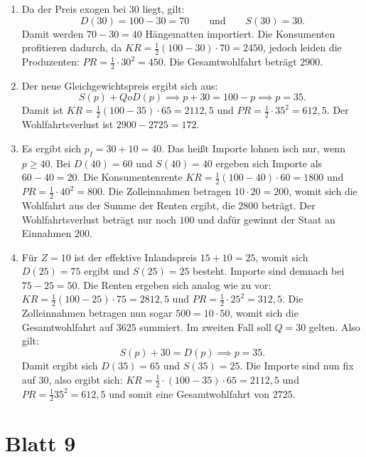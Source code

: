 \begin{solution}
	\begin{enumerate}
		\item Da der Preis exogen bei $30$ liegt, gilt:
		      \[
			      D(30) = 100-30 = 70 \qquad \text{und} \qquad S(30) = 30
			      .\]
		      Damit werden $70-30 = 40$ Hängematten importiert.
		      Die Konsumenten profitieren dadurch, da $KR = \frac{1}{2} (100-30) \cdot 70 = 2450$, jedoch leiden die Produzenten: $PR= \frac{1}{2} \cdot 30^2 = 450$.
		      Die Gesamtwohlfahrt beträgt $2900$.
		\item Der neue Gleichgewichtspreis ergibt sich aus:
		      \[
			      S(p) + Q o D(p) \implies p+30 = 100-p \implies p = 35
			      .\]
		      Damit ist $KR= \frac{1}{2} (100-35) \cdot 65 = 2112,5$ und $PR= \frac{1}{2} \cdot 35^2 = 612,5$.
		      Der Wohlfahrtsverlust ist $2900-2725 = 172$.
		\item Es ergibt sich $p_{I} = 30+10 = 40$. Das heißt Importe lohnen isch nur, wenn $p\ge 40$. Bei $D(40) = 60$ und $S(40)=40$ ergeben sich Importe als $60-40=20$.
		      Die Konsumentenrente $KR= \frac{1}{2} (100-40) \cdot 60= 1800$ und $PR=\frac{1}{2} \cdot 40^2 = 800$.
		      Die Zolleinnahmen betragen $10\cdot 20=200$, womit sich die Wohlfahrt aus der Summe der Renten ergibt, die $2800$ beträgt.
		      Der Wohlfahrtsverlust beträgt nur noch $100$ und dafür gewinnt der Staat an Einnahmen $200$.
		\item Für $Z=10$  ist der effektive Inlandspreis $15+10 = 25$, womit sich $D(25) = 75$ ergibt und $S(25)=25$ besteht. Importe sind demnach bei $75-25=50$.
		      Die Renten ergeben sich analog wie zu vor: $KR= \frac{1}{2} (100-25) \cdot 75 = 2812,5$ und $PR= \frac{1}{2} \cdot 25^2 = 312,5$.
		      Die Zolleinnahmen betragen nun sogar $500 = 10 \cdot 50$, womit sich die Gesamtwohlfahrt auf $3625$ summiert.
		      Im zweiten Fall soll $Q=30$ gelten. Also gilt:
		      \[
			      S(p) + 30 = D(p) \implies p = 35
			      .\]
		      Damit ergibt sich $D(35)=65$ und $S(35) = 25$. Die Importe sind nun fix auf $30$, also ergibt sich: $KR= \frac{1}{2} \cdot (100-35)\cdot 65 = 2112,5$ und $PR= \frac{1}{2} 35^2 = 612,5$ und somit eine Gesamtwohlfahrt von $2725$.
	\end{enumerate}
\end{solution}




\section{Blatt 9}

